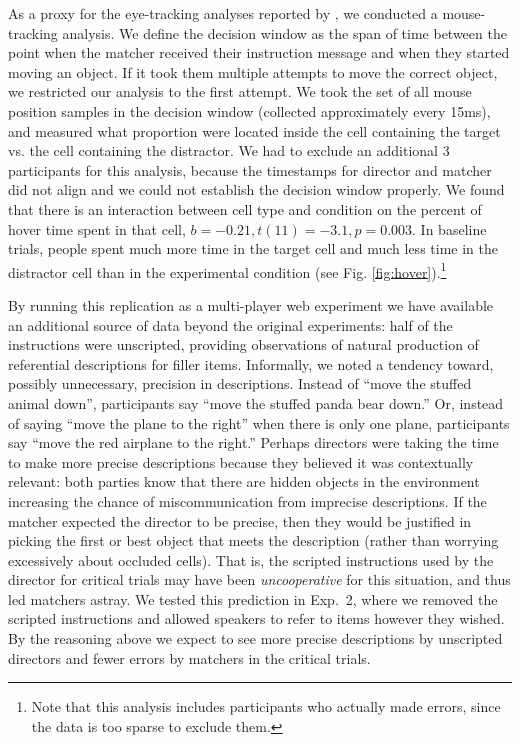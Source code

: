 \documentclass[10pt,letterpaper]{article}
\begin{document}
As a proxy for the eye-tracking analyses reported by , we conducted a mouse-tracking analysis. We define the decision window as the span of time between the point when the matcher received their instruction message and when they started moving an object. If it took them multiple attempts to move the correct object, we restricted our analysis to the first attempt. We took the set of all mouse position samples in the decision window (collected approximately every 15ms), and measured what proportion were located inside the cell containing the target vs. the cell containing the distractor.  We had to exclude an additional 3 participants for this analysis, because the timestamps for director and matcher did not align and we could not establish the decision window properly.
We found that there is an interaction between cell type and condition on the percent of hover time spent in that cell, $b = -0.21, t(11) = -3.1, p = 0.003$. In baseline trials, people spent much more time in the target cell and much less time in the distractor cell than in the experimental condition (see Fig. \ref{fig:hover}).\footnote{Note that this analysis includes participants who actually made errors, since the data is too sparse to exclude them.} %

By running this replication as a multi-player web experiment we have available an additional source of data beyond the original experiments: half of the instructions were unscripted, providing observations of natural production of referential descriptions for filler items. 
Informally, we noted a tendency toward, possibly unnecessary, precision in descriptions. Instead of ``move the stuffed animal down'', participants say ``move the stuffed panda bear down.'' Or, instead of saying ``move the plane to the right'' when there is only one plane, participants say ``move the red airplane to the right.'' 
Perhaps directors were taking the time to make more precise descriptions because they believed it was contextually relevant: both parties know that there are hidden objects in the environment increasing the chance of miscommunication from imprecise descriptions. 
If the matcher expected the director to be precise, then they would be justified in picking the first or best object that meets the description (rather than worrying excessively about occluded cells). 
That is, the scripted instructions used by the director for critical trials may have been \emph{uncooperative} for this situation, and thus led matchers astray. 
We tested this prediction in Exp.~2, where we removed the scripted instructions and allowed speakers to refer to items however they wished.
By the reasoning above we expect to see more precise descriptions by unscripted directors and fewer errors by matchers in the critical trials.
\end{document}
